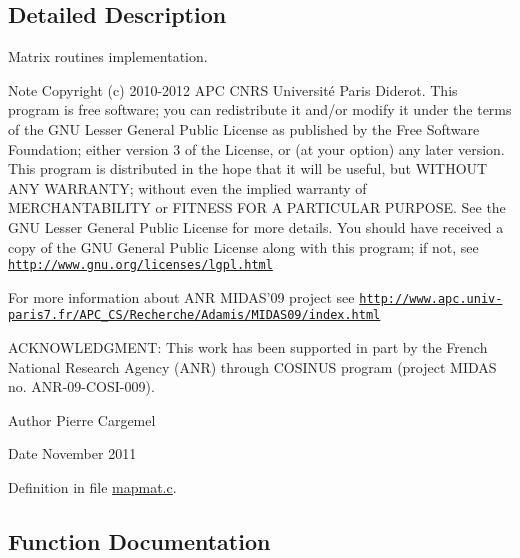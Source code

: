 \subsection{Detailed Description}
Matrix routines implementation. \begin{DoxyNote}{Note}
Copyright (c) 2010-\/2012 A\-P\-C C\-N\-R\-S Université Paris Diderot. This program is free software; you can redistribute it and/or modify it under the terms of the G\-N\-U Lesser General Public License as published by the Free Software Foundation; either version 3 of the License, or (at your option) any later version. This program is distributed in the hope that it will be useful, but W\-I\-T\-H\-O\-U\-T A\-N\-Y W\-A\-R\-R\-A\-N\-T\-Y; without even the implied warranty of M\-E\-R\-C\-H\-A\-N\-T\-A\-B\-I\-L\-I\-T\-Y or F\-I\-T\-N\-E\-S\-S F\-O\-R A P\-A\-R\-T\-I\-C\-U\-L\-A\-R P\-U\-R\-P\-O\-S\-E. See the G\-N\-U Lesser General Public License for more details. You should have received a copy of the G\-N\-U General Public License along with this program; if not, see \href{http://www.gnu.org/licenses/lgpl.html}{\tt http\-://www.\-gnu.\-org/licenses/lgpl.\-html}

For more information about A\-N\-R M\-I\-D\-A\-S'09 project see \href{http://www.apc.univ-paris7.fr/APC_CS/Recherche/Adamis/MIDAS09/index.html}{\tt http\-://www.\-apc.\-univ-\/paris7.\-fr/\-A\-P\-C\-\_\-\-C\-S/\-Recherche/\-Adamis/\-M\-I\-D\-A\-S09/index.\-html} 

A\-C\-K\-N\-O\-W\-L\-E\-D\-G\-M\-E\-N\-T\-: This work has been supported in part by the French National Research Agency (A\-N\-R) through C\-O\-S\-I\-N\-U\-S program (project M\-I\-D\-A\-S no. A\-N\-R-\/09-\/\-C\-O\-S\-I-\/009). 
\end{DoxyNote}
\begin{DoxyAuthor}{Author}
Pierre Cargemel 
\end{DoxyAuthor}
\begin{DoxyDate}{Date}
November 2011 
\end{DoxyDate}


Definition in file \hyperlink{mapmat_8c_source}{mapmat.\-c}.



\subsection{Function Documentation}
